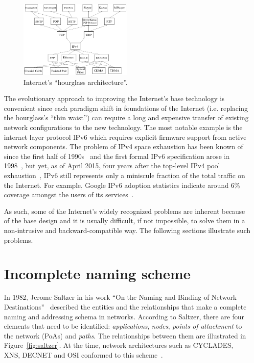     \begin{figure}[H]
        \begin{center}
            \includegraphics[width=0.5\textwidth]{fig/problems_hourglass.png}
          \caption{Internet's ``hourglass architecture''.}
          \label{fig:inet_hourglass}
        \end{center}
    \end{figure}


    The evolutionary approach to improving the Internet's base technology is convenient since each paradigm shift in foundations of the Internet (i.e. replacing the hourglass's ``thin waist'') can require a long and expensive transfer of existing network configurations to the new technology. The most notable example is the internet layer protocol IPv6 which requires explicit firmware support from active network components. The problem of IPv4 space exhaustion has been known of since the first half of 1990s~\cite{rfc1631} and the first formal IPv6 specification arose in 1998~\cite{rfc2460}, but yet, as of April 2015, four years after the top-level IPv4 pool exhaustion~\cite{ipv4_exhaustion}, IPv6 still represents only a miniscule fraction of the total traffic on the Internet. For example, Google IPv6 adoption statistics indicate around 6\% coverage amongst the users of its services~\cite{ipv6stats}.

    As such, some of the Internet's widely recognized problems are inherent because of the base design and it is usually difficult, if not impossible, to solve them in a non-intrusive and backward-compatible way. The following sections illustrate such problems.

    \section{Incomplete naming scheme}\label{problems:naming}

        In 1982, Jerome Saltzer in his work ``On the Naming and Binding of Network Destinations''~\cite{rfc1498} described the entities and the relationships that make a complete naming and addressing schema in networks. According to Saltzer, there are four elements that need to be identified: \emph{applications}, \emph{nodes}, \emph{points of attachment} to the network (PoAs) and \emph{paths}. The relationships between them are illustrated in Figure~\ref{fig:saltzer}. At the time, network architectures such as CYCLADES, XNS, DECNET and OSI conformed to this scheme~\cite{internet_demo}.


